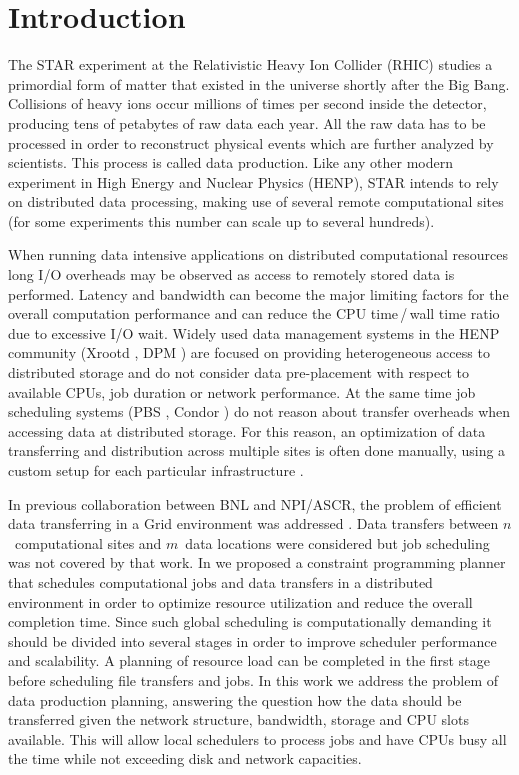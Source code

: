 \documentclass{svjour3}                     %
\begin{document}
\section{Introduction}
\label{intro}
The STAR experiment at the Relativistic Heavy Ion Collider (RHIC) studies a
primordial form of matter that existed in the universe shortly after the Big
Bang. Collisions of heavy ions occur millions of times per second inside the
detector, producing tens of petabytes of raw data each year. All the raw data
has to be processed in order to reconstruct physical events which are
further analyzed by scientists. This process is called data production.  Like
any other modern experiment in High Energy and Nuclear Physics (HENP), STAR intends to rely on
distributed data processing, making use of several remote computational sites
(for some experiments this number can scale up to several hundreds).

When running data intensive applications on distributed computational
resources long I/O overheads may be observed as access to remotely stored data
is performed. Latency and bandwidth can become the major limiting factors for
the overall computation performance and can reduce the CPU time\,/\,wall time 
ratio due to excessive I/O wait. 
Widely used data management systems in the HENP community
(Xrootd \cite{Xrootd}, DPM \cite{DPM}) are focused on providing heterogeneous access to distributed
storage and do not consider data pre-placement with respect to available CPUs,
job duration or network performance. At the same time job scheduling systems
(PBS \cite{PBS}, Condor \cite{Torque}) do not reason about transfer overheads when accessing data at
distributed storage. For this reason, an optimization of data transferring and
distribution across multiple sites is often done manually, using a custom
setup for each particular infrastructure \cite{Balewski}. 

In previous collaboration between BNL and NPI/ASCR, the problem of
efficient data transferring in a Grid environment was addressed \cite{Zerola}.
Data transfers between $n$~computational sites and $m$~data locations were
considered but job scheduling was not covered
by that work. In \cite{ACAT_cp} we
proposed a constraint programming planner that schedules computational jobs
and data transfers in a distributed environment in order to optimize resource
utilization and reduce the overall completion time. Since such global
scheduling is computationally demanding it should be divided into several
stages in order to improve scheduler performance and scalability. A planning of
resource load can be completed in the first stage before scheduling file
transfers and jobs. In this work we address the problem of data production
planning, answering the question how the data should be transferred given the
network structure, bandwidth, storage and CPU slots available. This will allow
local schedulers to process jobs and have CPUs busy all the time while not
exceeding disk and network capacities.
\end{document}
